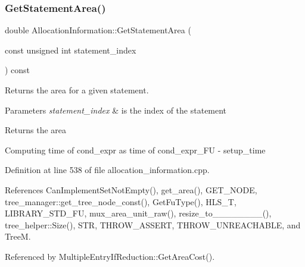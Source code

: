 \subsubsection{\texorpdfstring{Get\+Statement\+Area()}{GetStatementArea()}}
{\footnotesize\ttfamily double Allocation\+Information\+::\+Get\+Statement\+Area (\begin{DoxyParamCaption}\item[{const unsigned int}]{statement\+\_\+index }\end{DoxyParamCaption}) const}



Returns the area for a given statement. 


\begin{DoxyParams}{Parameters}
{\em statement\+\_\+index} & is the index of the statement \\
\hline
\end{DoxyParams}
\begin{DoxyReturn}{Returns}
the area 
\end{DoxyReturn}
Computing time of cond\+\_\+expr as time of cond\+\_\+expr\+\_\+\+FU -\/ setup\+\_\+time 

Definition at line 538 of file allocation\+\_\+information.\+cpp.



References Can\+Implement\+Set\+Not\+Empty(), get\+\_\+area(), G\+E\+T\+\_\+\+N\+O\+DE, tree\+\_\+manager\+::get\+\_\+tree\+\_\+node\+\_\+const(), Get\+Fu\+Type(), H\+L\+S\+\_\+T, L\+I\+B\+R\+A\+R\+Y\+\_\+\+S\+T\+D\+\_\+\+FU, mux\+\_\+area\+\_\+unit\+\_\+raw(), resize\+\_\+to\+\_\+\_\+\_\+\_\+\_\+\_\+\_\+\_(), tree\+\_\+helper\+::\+Size(), S\+TR, T\+H\+R\+O\+W\+\_\+\+A\+S\+S\+E\+RT, T\+H\+R\+O\+W\+\_\+\+U\+N\+R\+E\+A\+C\+H\+A\+B\+LE, and TreeM.



Referenced by Multiple\+Entry\+If\+Reduction\+::\+Get\+Area\+Cost().

